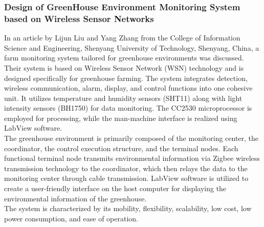 \documentclass[12pt, a4paper]{article}
\begin{document}
\subsubsection{Design of GreenHouse Environment Monitoring System based on Wireless Sensor Networks}
In an article by Lijun Liu and Yang Zhang \cite{liu2017design} from the College of Information Science and Engineering, Shenyang University of Technology, Shenyang, China, a farm monitoring system tailored for greenhouse environments was discussed.\\
Their system is based on Wireless Sensor Network (WSN) technology and is designed specifically for greenhouse farming. The system integrates detection, wireless communication, alarm, display, and control functions into one cohesive unit. It utilizes temperature and humidity sensors (SHT11) along with light intensity sensors (BH1750) for data monitoring. The CC2530 microprocessor is employed for processing, while the man-machine interface is realized using LabView software.\\
The greenhouse environment is primarily composed of the monitoring center, the coordinator, the control execution structure, and the terminal nodes. Each functional terminal node transmits environmental information via Zigbee wireless transmission technology to the coordinator, which then relays the data to the monitoring center through cable transmission. LabView software is utilized to create a user-friendly interface on the host computer for displaying the environmental information of the greenhouse.\\
The system is characterized by its mobility, flexibility, scalability, low cost, low power consumption, and ease of operation.
\end{document}
